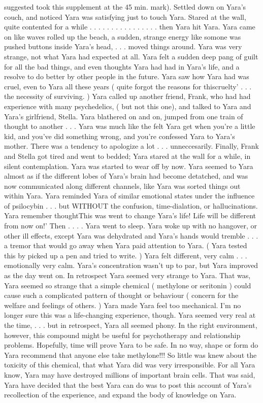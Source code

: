 \documentclass[12pt]{book}
\begin{document}
suggested took this supplement at the 45 min. mark). Settled down on Yara's couch, and noticed Yara was satisfying just to touch Yara. Stared at the wall, quite contented for a while . . .   . . .   . . .   . . .   . . .  . then Yara hit Yara. Yara came on like waves rolled up the beach, a sudden, strange energy like somone was pushed buttons inside Yara's head, . . .  moved things around. Yara was very strange, not what Yara had expected at all. Yara felt a sudden deep pang of guilt for all the bad things, and even thoughts Yara had had in Yara's life, and a resolve to do better by other people in the future. Yara saw how Yara had was cruel, even to Yara all these years ( quite forgot the reasons for thiscruelty' . . .  the necessity of surviving. ) Yara called up another friend, Frank, who had had experience with many psychedelics, ( but not this one), and talked to Yara and Yara's girlfriend, Stella. Yara blathered on and on, jumped from one train of thought to another . . .  Yara was much like the felt Yara get when you're a little kid, and you've did something wrong, and you're confessed Yara to Yara's mother. There was a tendency to apologize a lot . . .  unneccesarily. Finally, Frank and Stella got tired and went to bedded; Yara stared at the wall for a while, in silent contemplation. Yara was started to wear off by now. Yara seemed to Yara almost as if the different lobes of Yara's brain had become detatched, and was now communicated along different channels, like Yara was sorted things out within Yara. Yara reminded Yara of similar emotional states under the influence of psilocybin . . .  but WITHOUT the confusion, time-dialation, or hallucinations. Yara remember thoughtThis was went to change Yara's life! Life will be different from now on!' Then . . .  . Yara went to sleep. Yara woke up with no hangover, or other ill effects, except Yara was dehydrated and Yara's hands would tremble . . .  a tremor that would go away when Yara paid attention to Yara. ( Yara tested this by picked up a pen and tried to write. ) Yara felt different, very calm . . .  emotionally very calm. Yara's concentration wasn't up to par, but Yara improved as the day went on. In retrospect Yara seemed very strange to Yara. That was, Yara seemed so strange that a simple chemical ( methylone or seritonin ) could cause such a complicated pattern of thought or behaviour ( concern for the welfare and feelings of others. ) Yara made Yara feel too mechanical. I'm no longer sure this was a life-changing experience, though. Yara seemed very real at the time, . . .  but in retrospect, Yara all seemed phony. In the right environment, however, this compound might be useful for psychotherapy and relationship problems. Hopefully, time will prove Yara to be safe. In no way, shape or form do Yara recommend that anyone else take methylone!!! So little was knew about the toxicity of this chemical, that what Yara did was very irresponsible. For all Yara know, Yara may have destroyed millions of important brain cells. That was said, Yara have decided that the best Yara can do was to post this account of Yara's recollection of the experience, and expand the body of knowledge on Yara.
\end{document}
